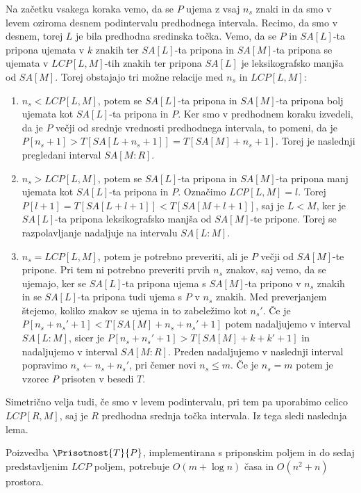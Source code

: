 Na začetku vsakega koraka vemo, da se $P$ ujema z vsaj $n_s$ znaki in da smo v levem oziroma desnem podintervalu predhodnega intervala. Recimo, da smo v desnem, torej $L$ je bila predhodna sredinska točka. Vemo, da se $P$ in $SA[L]$-ta pripona ujemata v $k$ znakih ter $SA[L]$-ta pripona in $SA[M]$-ta pripona se ujemata v $LCP[L,M]$-tih znakih ter pripona $SA[L]$ je leksikografsko manjša od $SA[M]$. Torej obstajajo tri možne relacije med $n_s$ in $LCP[L,M]$:
\begin{enumerate}
    \item $n_s<LCP[L,M]$, potem se $SA[L]$-ta pripona in $SA[M]$-ta pripona bolj ujemata kot $SA[L]$-ta pripona in $P$. Ker smo v predhodnem koraku izvedeli, da je $P$ večji od srednje vrednosti predhodnega intervala, to pomeni, da je $P[n_s+1]>T[SA[L+n_s+1]]=T[SA[M]+n_s+1]$. Torej je naslednji pregledani interval $SA[M:R]$.
    \item $n_s>LCP[L,M]$, potem se $SA[L]$-ta pripona in $SA[M]$-ta pripona manj ujemata kot $SA[L]$-ta pripona in $P$. Označimo \textit{LCP}$[L,M]=l$. Torej $P[l+1]=T[SA[L+l+1]]<T[SA[M+l+1]]$, saj je $L<M$, ker je $SA[L]$-ta pripona leksikografsko manjša od $SA[M]$-te pripone. Torej se razpolavljanje nadaljuje na intervalu $SA[L:M]$.
    \item $n_s=LCP[L,M]$, potem je potrebno preveriti, ali je $P$ večji od $SA[M]$-te pripone. Pri tem ni potrebno preveriti prvih $n_s$ znakov, saj vemo, da se ujemajo, ker se $SA[L]$-ta pripona ujema s $SA[M]$-ta pripono v $n_s$ znakih in se $SA[L]$-ta pripona tudi ujema s $P$ v $n_s$ znakih. Med preverjanjem štejemo, koliko znakov se ujema in to zabeležimo kot $n_s'$. Če je $P[n_s+n_s'+1]<T[SA[M]+n_s+n_s'+1]$ potem nadaljujemo v interval $SA[L:M]$, sicer je $P[n_s+n_s'+1]>T[SA[M]+k+k'+1]$ in nadaljujemo v interval $SA[M:R]$. Preden nadaljujemo v naslednji interval popravimo $n_s\leftarrow n_s+n_s'$, pri čemer novi $n_s\le m$. Če je $n_s=m$ potem je vzorec $P$ prisoten v besedi $T$.
\end{enumerate}
Simetrično velja tudi, če smo v levem podintervalu, pri tem pa uporabimo celico $LCP[R,M]$, saj je $R$ predhodna srednja točka intervala. Iz tega sledi naslednja lema.


\begin{lema}\label{lema:LCPKvadrat}
    Poizvedba $\Prisotnost{T}{P}$, implementirana s priponskim poljem in do sedaj predstavljenim $LCP$ poljem, potrebuje $O(m+\log{n})$ časa in $O(n^2 +n)$ prostora.
\end{lema}


